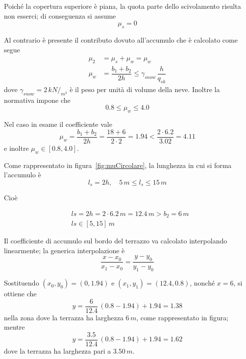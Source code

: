 Poiché la copertura superiore è piana, la quota parte dello scivolamento risulta non esserci; di conseguenza si assume
\[
	\mu_s = 0
\]

Al contrario è presente il contributo dovuto all'accumulo che è calcolato come segue
\begin{align*}
 \mu_2 &= \mu_s + \mu_w = \mu_w\\
 \mu_w &=  \dfrac{b_1 + b_2}{2 h}\leq \gamma_{snow}\,\dfrac{h}{q_{sk}}
\end{align*}
dove $\gamma_{snow} = 2\,kN/_{m^3}$ è il peso per unità di volume della neve. Inoltre la normativa impone che 
\[
 0.8 \leq \mu_w \leq 4.0
\]

Nel caso in esame il coefficiente vale
\[
 \mu_w =  \dfrac{b_1 + b_2}{2 h} = \dfrac{18+6}{2\cdot 2} = 1.94 < \dfrac{2\cdot 6.2}{3.02} = 4.11
\]
e inoltre $\mu_w \in [0.8, 4.0]$.


Come rappresentato in figura~\ref{fig:muCircolare}, la lunghezza in cui si forma l'accumulo è
\[
 l_s = 2 h, \quad 5\,m\leq l_s \leq 15\,m
\]

Cioè

\begin{align*}
  &ls = 2 h = 2\cdot 6.2\,m = 12.4\,m > b_2 = 6\,m\\
  &ls \in [5, 15]\,m
\end{align*}

Il coefficiente di accumulo sul bordo del terrazzo va calcolato interpolando linearmente; la generica interpolazione è
\[
 \dfrac{x-x_0}{x_1-x_0} = \dfrac{y-y_0}{y_1-y_0}
\]

Sostituendo $(x_0, y_0) = (0, 1.94)$ e $(x_1, y_1) = (12.4, 0.8)$, nonché $x = 6$, si ottiene che
\[ 
 y = \dfrac{6}{12.4}\,(0.8-1.94) + 1.94 = 1.38
\]
nella zona dove la terrazza ha larghezza $6\,m$, come rappresentato in figura; mentre
\[
 y = \dfrac{3.5}{12.4}\,(0.8-1.94) + 1.94 = 1.62
\]
dove la terrazza ha larghezza pari a $3.50\,m$.







